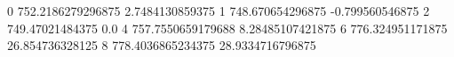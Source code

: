 0 752.2186279296875 2.7484130859375
1 748.670654296875 -0.799560546875
2 749.47021484375 0.0
4 757.7550659179688 8.28485107421875
6 776.324951171875 26.854736328125
8 778.4036865234375 28.9334716796875
